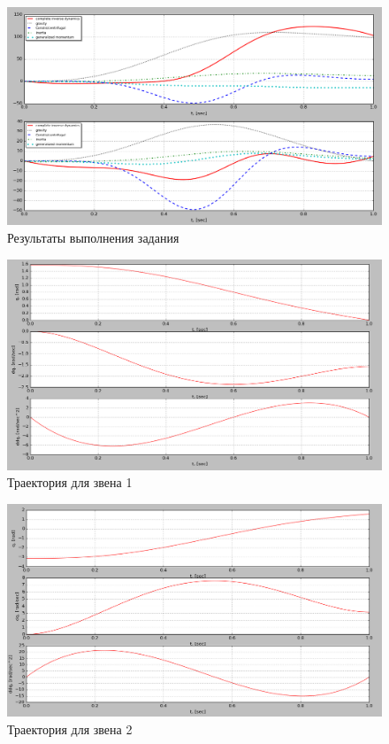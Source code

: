 \documentclass[a4paper,14pt]{extreport}
\begin{document}
\begin{figure}[]
	\center\includegraphics[width=0.9\linewidth]{images/4.png}
	\caption{Результаты выполнения задания}
	\label{fig:scr1}
\end{figure}

\begin{figure}[H]
	\center\includegraphics[width=0.9\linewidth]{images/q1.png}
	\caption{Траектория для звена 1}
	\label{fig:scr1}
\end{figure}


\begin{figure}[H]
	\center\includegraphics[width=0.9\linewidth]{images/q2.png}
	\caption{Траектория для звена 2}
	\label{fig:scr1}
\end{figure}
\end{document}
